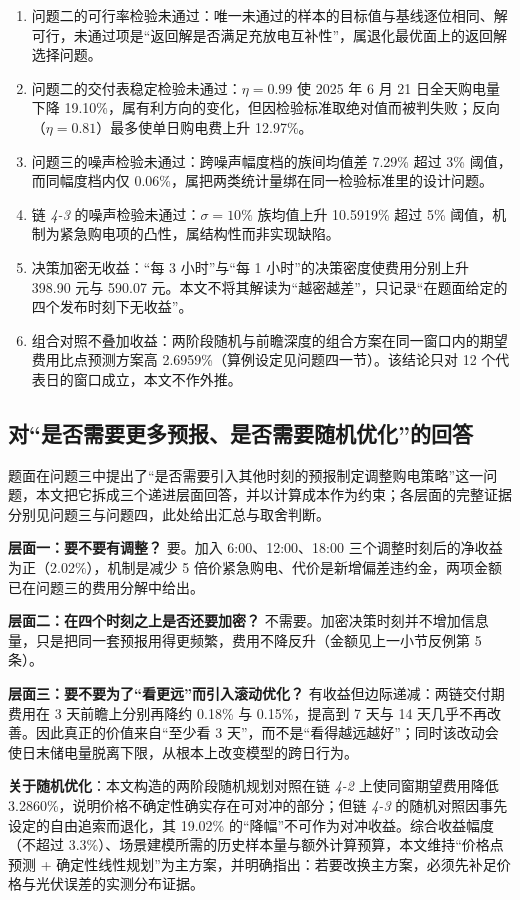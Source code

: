 \begin{enumerate}[leftmargin=2.2em,itemsep=1pt]
  \item 问题二的可行率检验未通过：唯一未通过的样本的目标值与基线逐位相同、解可行，未通过项是“返回解是否满足充放电互补性”，属退化最优面上的返回解选择问题。
  \item 问题二的交付表稳定检验未通过：$\eta=0.99$ 使 2025 年 6 月 21 日全天购电量下降 19.10\%，属有利方向的变化，但因检验标准取绝对值而被判失败；反向（$\eta=0.81$）最多使单日购电费上升 12.97\%。
  \item 问题三的噪声检验未通过：跨噪声幅度档的族间均值差 7.29\% 超过 3\% 阈值，而同幅度档内仅 0.06\%，属把两类统计量绑在同一检验标准里的设计问题。
  \item 链 \emph{4-3} 的噪声检验未通过：$\sigma=10\%$ 族均值上升 10.5919\% 超过 5\% 阈值，机制为紧急购电项的凸性，属结构性而非实现缺陷。
  \item 决策加密无收益：“每 3 小时”与“每 1 小时”的决策密度使费用分别上升 398.90 元与 590.07 元。本文不将其解读为“越密越差”，只记录“在题面给定的四个发布时刻下无收益”。
  \item 组合对照不叠加收益：两阶段随机与前瞻深度的组合方案在同一窗口内的期望费用比点预测方案高 2.6959\%（算例设定见问题四一节）。该结论只对 12 个代表日的窗口成立，本文不作外推。
\end{enumerate}

\subsection{对“是否需要更多预报、是否需要随机优化”的回答}

题面在问题三中提出了“是否需要引入其他时刻的预报制定调整购电策略”这一问题，本文把它拆成三个递进层面回答，并以计算成本作为约束；各层面的完整证据分别见问题三与问题四，此处给出汇总与取舍判断。

\textbf{层面一：要不要有调整？} 要。加入 6:00、12:00、18:00 三个调整时刻后的净收益为正（2.02\%），机制是减少 5 倍价紧急购电、代价是新增偏差违约金，两项金额已在问题三的费用分解中给出。

\textbf{层面二：在四个时刻之上是否还要加密？} 不需要。加密决策时刻并不增加信息量，只是把同一套预报用得更频繁，费用不降反升（金额见上一小节反例第 5 条）。

\textbf{层面三：要不要为了“看更远”而引入滚动优化？} 有收益但边际递减：两链交付期费用在 3 天前瞻上分别再降约 0.18\% 与 0.15\%，提高到 7 天与 14 天几乎不再改善。因此真正的价值来自“至少看 3 天”，而不是“看得越远越好”；同时该改动会使日末储电量脱离下限，从根本上改变模型的跨日行为。

\textbf{关于随机优化}：本文构造的两阶段随机规划对照在链 \emph{4-2} 上使同窗期望费用降低 3.2860\%，说明价格不确定性确实存在可对冲的部分；但链 \emph{4-3} 的随机对照因事先设定的自由追索而退化，其 19.02\% 的“降幅”不可作为对冲收益。综合收益幅度（不超过 3.3\%）、场景建模所需的历史样本量与额外计算预算，本文维持“价格点预测 + 确定性线性规划”为主方案，并明确指出：若要改换主方案，必须先补足价格与光伏误差的实测分布证据\cite{ref-akbari-2019-stochastic-robust-arbitrage,ref-oconnor-2025-conformal-price-forecast}。
